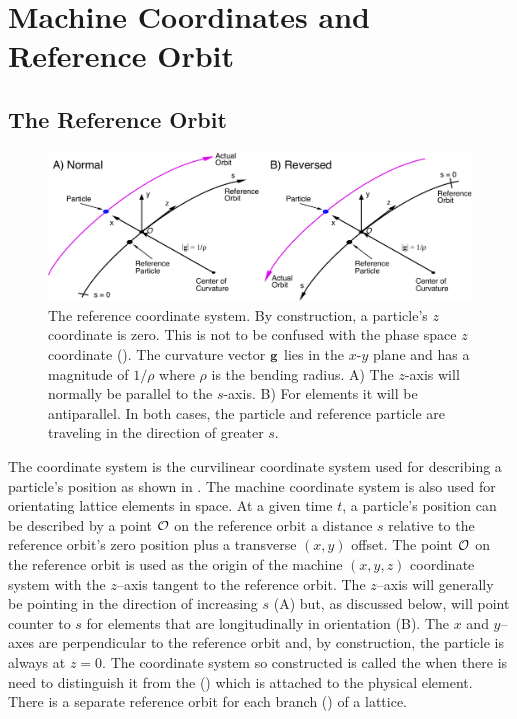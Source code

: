 \section{Machine Coordinates and Reference Orbit}
\label{s:machine.coords}

\subsection{The Reference Orbit}
\label{s:ref}

\begin{figure}[tb]
  \centering
  \includegraphics[width=6in]{machine-coords.pdf}
  \caption[Reference coordinate system.]
{The reference coordinate system. By construction, a particle's $z$ coordinate is zero.  This
is not to be confused with the phase space $z$ coordinate (). The curvature
vector ${\bf g}$ lies in the $x$-$y$ plane and has a magnitude of $1/\rho$ where $\rho$ is the bending
radius. A) The $z$-axis will normally be parallel to the $s$-axis. B) For  elements it
will be antiparallel. In both cases, the particle and reference particle are traveling in the
direction of greater $s$.}
  \label{f:machine.coords}
\end{figure}

The  coordinate system is the curvilinear coordinate system used for describing
a particle's position as shown in . The machine coordinate system is also used for
orientating lattice elements in space. At a given time $t$, a particle's position can be described
by a point ${\cal O}$ on the reference orbit a distance $s$ relative to the reference orbit's zero
position plus a transverse $(x,y)$ offset. The point ${\cal O}$ on the reference orbit is used as the
origin of the machine $(x, y, z)$ coordinate system with the $z$--axis tangent to the reference
orbit. The $z$--axis will generally be pointing in the direction of increasing $s$
(A) but, as discussed below, will point counter to $s$ for elements that are
longitudinally  in orientation (B). 
The $x$ and $y$--axes are perpendicular to the reference
orbit and, by construction, the particle is always at $z = 0$. The coordinate system so constructed
is called the  when there is need to distinguish it from the 
() which is attached to the physical element. There is a separate reference orbit
for each branch () of a lattice.


